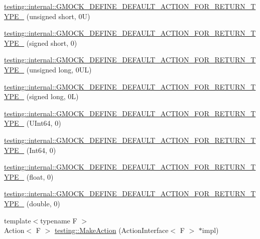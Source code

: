 \begin{DoxyCompactItemize}
\item 
\hyperlink{namespacetesting_1_1internal_ab2965a6078670393812e67f8e5fcb072}{testing\+::internal\+::\+G\+M\+O\+C\+K\+\_\+\+D\+E\+F\+I\+N\+E\+\_\+\+D\+E\+F\+A\+U\+L\+T\+\_\+\+A\+C\+T\+I\+O\+N\+\_\+\+F\+O\+R\+\_\+\+R\+E\+T\+U\+R\+N\+\_\+\+T\+Y\+P\+E\+\_\+} (unsigned short, 0\+U)
\item 
\hyperlink{namespacetesting_1_1internal_ae6ea5db83b290e2412f321c3b1eb8c47}{testing\+::internal\+::\+G\+M\+O\+C\+K\+\_\+\+D\+E\+F\+I\+N\+E\+\_\+\+D\+E\+F\+A\+U\+L\+T\+\_\+\+A\+C\+T\+I\+O\+N\+\_\+\+F\+O\+R\+\_\+\+R\+E\+T\+U\+R\+N\+\_\+\+T\+Y\+P\+E\+\_\+} (signed short, 0)
\item 
\hyperlink{namespacetesting_1_1internal_a1f4167b954a7ff0074ce8a5bb855f86f}{testing\+::internal\+::\+G\+M\+O\+C\+K\+\_\+\+D\+E\+F\+I\+N\+E\+\_\+\+D\+E\+F\+A\+U\+L\+T\+\_\+\+A\+C\+T\+I\+O\+N\+\_\+\+F\+O\+R\+\_\+\+R\+E\+T\+U\+R\+N\+\_\+\+T\+Y\+P\+E\+\_\+} (unsigned long, 0\+U\+L)
\item 
\hyperlink{namespacetesting_1_1internal_ad8804e25537427755c324ab03a72e776}{testing\+::internal\+::\+G\+M\+O\+C\+K\+\_\+\+D\+E\+F\+I\+N\+E\+\_\+\+D\+E\+F\+A\+U\+L\+T\+\_\+\+A\+C\+T\+I\+O\+N\+\_\+\+F\+O\+R\+\_\+\+R\+E\+T\+U\+R\+N\+\_\+\+T\+Y\+P\+E\+\_\+} (signed long, 0\+L)
\item 
\hyperlink{namespacetesting_1_1internal_ad2efcdbd12c7c020745b87bcc0997809}{testing\+::internal\+::\+G\+M\+O\+C\+K\+\_\+\+D\+E\+F\+I\+N\+E\+\_\+\+D\+E\+F\+A\+U\+L\+T\+\_\+\+A\+C\+T\+I\+O\+N\+\_\+\+F\+O\+R\+\_\+\+R\+E\+T\+U\+R\+N\+\_\+\+T\+Y\+P\+E\+\_\+} (U\+Int64, 0)
\item 
\hyperlink{namespacetesting_1_1internal_ab427739121a380a7934bda96153f053d}{testing\+::internal\+::\+G\+M\+O\+C\+K\+\_\+\+D\+E\+F\+I\+N\+E\+\_\+\+D\+E\+F\+A\+U\+L\+T\+\_\+\+A\+C\+T\+I\+O\+N\+\_\+\+F\+O\+R\+\_\+\+R\+E\+T\+U\+R\+N\+\_\+\+T\+Y\+P\+E\+\_\+} (Int64, 0)
\item 
\hyperlink{namespacetesting_1_1internal_a71c697e5b567365fd3ff6c720769633b}{testing\+::internal\+::\+G\+M\+O\+C\+K\+\_\+\+D\+E\+F\+I\+N\+E\+\_\+\+D\+E\+F\+A\+U\+L\+T\+\_\+\+A\+C\+T\+I\+O\+N\+\_\+\+F\+O\+R\+\_\+\+R\+E\+T\+U\+R\+N\+\_\+\+T\+Y\+P\+E\+\_\+} (float, 0)
\item 
\hyperlink{namespacetesting_1_1internal_a7ba92aa33f4968c902623cd02e445020}{testing\+::internal\+::\+G\+M\+O\+C\+K\+\_\+\+D\+E\+F\+I\+N\+E\+\_\+\+D\+E\+F\+A\+U\+L\+T\+\_\+\+A\+C\+T\+I\+O\+N\+\_\+\+F\+O\+R\+\_\+\+R\+E\+T\+U\+R\+N\+\_\+\+T\+Y\+P\+E\+\_\+} (double, 0)
\item 
{\footnotesize template$<$typename F $>$ }\\Action$<$ F $>$ \hyperlink{namespacetesting_ae6b9960db2b2685e043ce5215291f5b8}{testing\+::\+Make\+Action} (Action\+Interface$<$ F $>$ $\ast$impl)

\end{DoxyCompactItemize}
